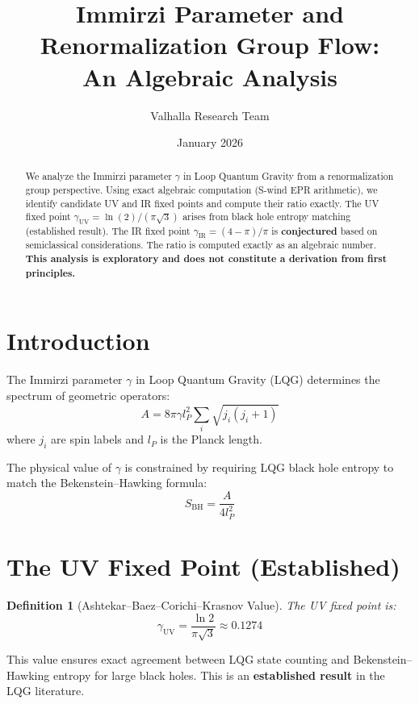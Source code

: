 \documentclass[11pt,a4paper]{article}
\title{Immirzi Parameter and Renormalization Group Flow:\\An Algebraic Analysis}
\author{Valhalla Research Team}
\date{January 2026}
\theoremstyle{plain}
\newtheorem{definition}[theorem]{Definition}
\begin{document}
\maketitle

\begin{abstract}
We analyze the Immirzi parameter $\gamma$ in Loop Quantum Gravity from a renormalization group perspective. Using exact algebraic computation (S-wind EPR arithmetic), we identify candidate UV and IR fixed points and compute their ratio exactly. The UV fixed point $\gamma_{\text{UV}} = \ln(2)/(\pi\sqrt{3})$ arises from black hole entropy matching (established result). The IR fixed point $\gamma_{\text{IR}} = (4-\pi)/\pi$ is \textbf{conjectured} based on semiclassical considerations. The ratio is computed exactly as an algebraic number. \textbf{This analysis is exploratory and does not constitute a derivation from first principles.}
\end{abstract}

\section{Introduction}

The Immirzi parameter $\gamma$ in Loop Quantum Gravity (LQG) determines the spectrum of geometric operators:
\begin{equation}
A = 8\pi\gamma l_P^2 \sum_i \sqrt{j_i(j_i+1)}
\end{equation}
where $j_i$ are spin labels and $l_P$ is the Planck length.

The physical value of $\gamma$ is constrained by requiring LQG black hole entropy to match the Bekenstein--Hawking formula:
\begin{equation}
S_{\text{BH}} = \frac{A}{4l_P^2}
\end{equation}

\section{The UV Fixed Point (Established)}

\begin{definition}[Ashtekar--Baez--Corichi--Krasnov Value]
The UV fixed point is:
\begin{equation}
\gamma_{\text{UV}} = \frac{\ln 2}{\pi\sqrt{3}} \approx 0.1274
\end{equation}
\end{definition}

This value ensures exact agreement between LQG state counting and Bekenstein--Hawking entropy for large black holes. This is an \textbf{established result} in the LQG literature.
\end{document}
